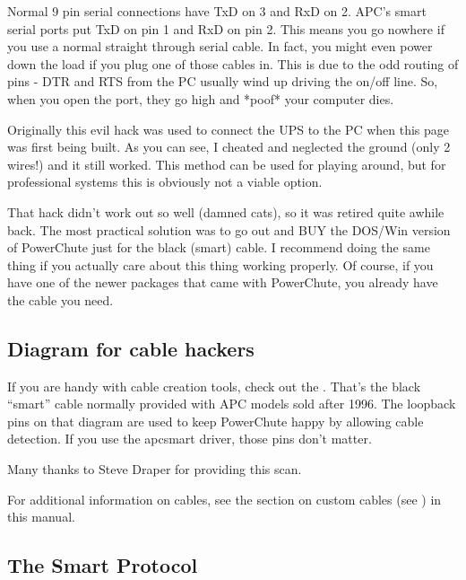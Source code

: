 {{{{{{{{{Normal 9 pin serial connections have TxD on 3 and RxD on 2. APC's smart serial
ports put TxD on pin 1 and RxD on pin 2. This means you go nowhere if you use
a normal straight through serial cable. In fact, you might even power down the
load if you plug one of those cables in. This is due to the odd routing of
pins - DTR and RTS from the PC usually wind up driving the on/off line. So,
when you open the port, they go high and *poof* your computer dies.  

Originally this evil hack was used to connect the UPS to the PC when this page
was first being built. As you can see, I cheated and neglected the ground
(only 2 wires!) and it still worked. This method can be used for playing
around, but for professional systems this is obviously not a viable option.  

That hack didn't work out so well (damned cats), so it was retired quite
awhile back. The most practical solution was to go out and BUY the DOS/Win
version of PowerChute just for the black (smart) cable. I recommend doing the
same thing if you actually care about this thing working properly. Of course,
if you have one of the newer packages that came with PowerChute, you already
have the cable you need. 

\label{Diagram-for-cable-hackers}

\subsection*{Diagram for cable hackers}

If you are handy with cable creation tools, check out the 
. That's the black
``smart'' cable normally provided with APC models sold after 1996. The
loopback pins on that diagram are used to keep PowerChute happy by allowing
cable detection. If you use the 
 apcsmart driver, those pins don't
matter.  

Many thanks to Steve Draper for providing this scan.  

For additional information on cables, see the section on custom cables (see 
) in this manual. 

\label{The-Smart-Protocol}

\subsection*{The Smart Protocol}

}}}}}}}}}
